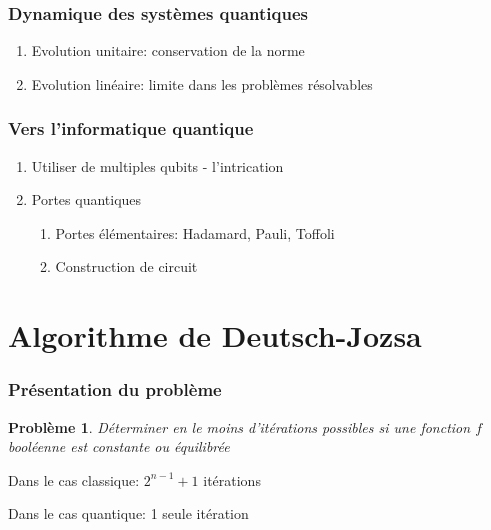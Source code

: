 \documentclass{beamer}
\newtheorem{pb}{Problème}
\begin{document}
\begin{frame}
\frametitle{Dynamique des systèmes quantiques}
\begin{enumerate}
  \item Evolution unitaire: conservation de la norme
  \item Evolution linéaire: limite dans les problèmes résolvables
\end{enumerate}
\end{frame}

\begin{frame}
  \frametitle{Vers l'informatique quantique}
  \begin{enumerate}
    \item Utiliser de multiples qubits - l'intrication
    \item Portes quantiques
    \begin{enumerate}
      \item Portes élémentaires: Hadamard, Pauli, Toffoli
      \item Construction de circuit
    \end{enumerate}
  \end{enumerate}
\end{frame}


\section{Algorithme de Deutsch-Jozsa}

\begin{frame}
\frametitle{Présentation du problème}

\begin{pb}
  Déterminer en le moins d'itérations possibles si une fonction $f$ booléenne est constante ou équilibrée
\end{pb}

\medbreak
Dans le cas classique: $2^{n-1} + 1$ itérations

\medbreak
Dans le cas quantique: 1 seule itération

\end{frame}
\end{document}
